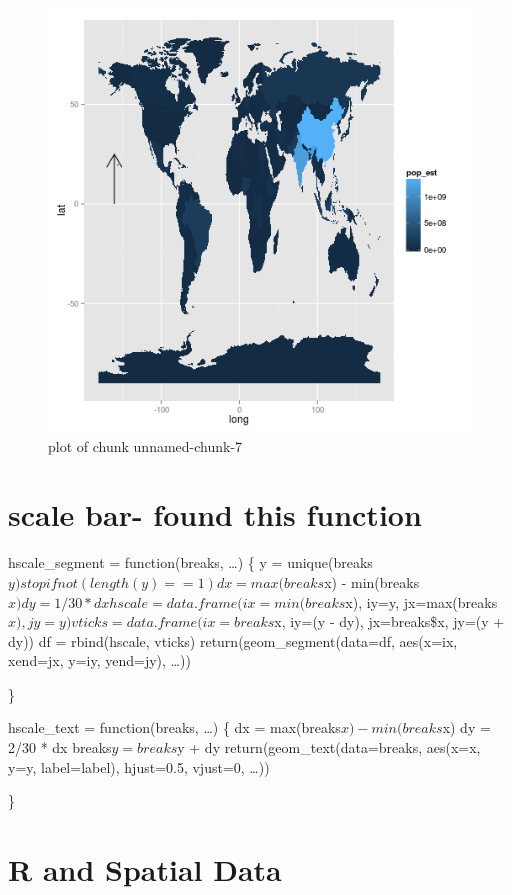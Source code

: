 \documentclass[]{article}
\makeatletter
\def\maxwidth{\ifdim\Gin@nat@width>\linewidth\linewidth
\else\Gin@nat@width\fi}
\let\Oldincludegraphics\includegraphics
\renewcommand{\includegraphics}[1]{\Oldincludegraphics[width=\maxwidth]{#1}}
\makeatother
\begin{document}
\begin{figure}[htbp]
\centering
\includegraphics{figure/unnamed-chunk-7.png}
\caption{plot of chunk unnamed-chunk-7}
\end{figure}

\section{scale bar- found this function}

hscale\_segment = function(breaks, \ldots{}) \{ y =
unique(breaks$y)     stopifnot(length(y) == 1)     dx = max(breaks$x) -
min(breaks$x)     dy = 1/30 * dx     hscale = data.frame(ix=min(breaks$x),
iy=y, jx=max(breaks$x), jy=y)     vticks = data.frame(ix=breaks$x, iy=(y
- dy), jx=breaks\$x, jy=(y + dy)) df = rbind(hscale, vticks)
return(geom\_segment(data=df, aes(x=ix, xend=jx, y=iy, yend=jy),
\ldots{}))

\}

hscale\_text = function(breaks, \ldots{}) \{ dx =
max(breaks$x) - min(breaks$x) dy = 2/30 * dx breaks$y = breaks$y + dy
return(geom\_text(data=breaks, aes(x=x, y=y, label=label), hjust=0.5,
vjust=0, \ldots{}))

\}

\section{R and Spatial Data}
\end{document}

